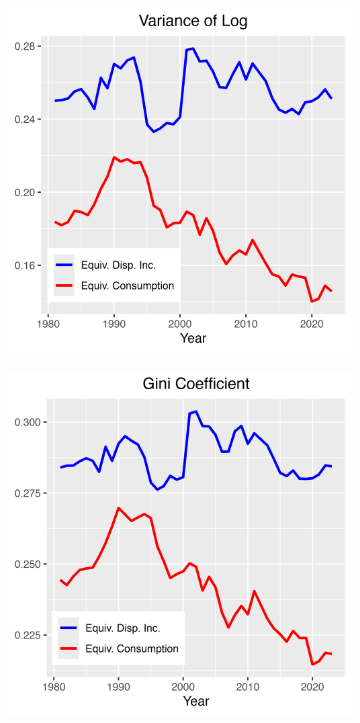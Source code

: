 \documentclass{article}
\begin{document}
\begin{figure}[p]
    \centering
    \begin{subfigure}[t]{0.475\textwidth}
        \centering
        \includegraphics[width=\textwidth]{figures/Fig_6/Fig_6a.png}
    \end{subfigure}
    \begin{subfigure}[t]{0.475\textwidth}
        \centering
        \includegraphics[width=\textwidth]{figures/Fig_6/Fig_6b.png}

\end{subfigure}
\end{figure}
\end{document}
